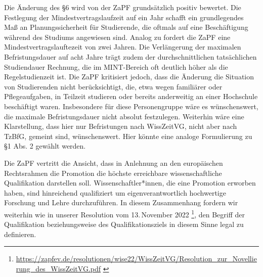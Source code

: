 \documentclass[DIV=calc]{scrartcl}
\begin{document}
Die Änderung des §6 wird von der ZaPF grundsätzlich positiv bewertet. Die Festlegung der Mindestvertragslaufzeit auf ein Jahr schafft ein grundlegendes Maß an Planungssicherheit für Studierende, die oftmals auf eine Beschäftigung während des Studiums angewiesen sind. Analog zu  fordert die ZaPF eine Mindestvertragslauftezeit von zwei Jahren. Die Verlängerung der maximalen Befristungsdauer auf acht Jahre trägt zudem der durchschnittlichen tatsächlichen Studiendauer Rechnung, die im MINT-Bereich oft deutlich höher als die Regelstudienzeit ist. Die ZaPF kritisiert jedoch, dass die Änderung die Situation von Studierenden nicht berücksichtigt, die, etwa wegen familiärer oder Pflegeaufgaben, in Teilzeit studieren oder bereits anderweitig an einer Hochschule beschäftigt waren. Insbesondere für diese Personengruppe wäre es wünschenswert, die maximale Befristungsdauer nicht absolut festzulegen. Weiterhin wäre eine Klarstellung, dass hier nur Befristungen nach WissZeitVG, nicht aber nach TzBfG, gemeint sind, wünschenswert. Hier könnte eine analoge Formulierung zu §1 Abs. 2 gewählt werden. 

Die ZaPF vertritt die Ansicht, dass in Anlehnung an den europäischen Rechtsrahmen die Promotion die höchste erreichbare wissenschaftliche Qualifikation darstellen soll. Wissenschaftler*innen, die eine Promotion erworben haben, sind hinreichend qualifiziert um eigenverantwortlich hochwertige Forschung und Lehre durchzuführen. In diesem Zusammenhang fordern wir weiterhin wie in unserer Resolution vom 13.\,November 2022 \footnote{\url{https://zapfev.de/resolutionen/wise22/WissZeitVG/Resolution\_zur\_Novellierung\_des\_WissZeitVG.pdf} \label{note2}}, den Begriff der Qualifikation beziehungsweise des Qualifikationsziels in diesem Sinne legal zu definieren.


\end{document}
